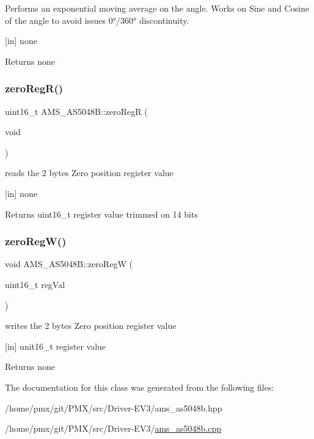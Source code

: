 Performs an exponential moving average on the angle. Works on Sine and Cosine of the angle to avoid issues 0°/360° discontinuity. 

\mbox{[}in\mbox{]} none \begin{DoxyReturn}{Returns}
none 
\end{DoxyReturn}
\mbox{\label{classAMS__AS5048B_a7784bc5f991bb485c2731a7189d277bf}} 
\subsubsection{\texorpdfstring{zero\+Reg\+R()}{zeroRegR()}}
{\footnotesize\ttfamily uint16\+\_\+t A\+M\+S\+\_\+\+A\+S5048\+B\+::zero\+RegR (\begin{DoxyParamCaption}\item[{void}]{ }\end{DoxyParamCaption})}



reads the 2 bytes Zero position register value 

\mbox{[}in\mbox{]} none \begin{DoxyReturn}{Returns}
uint16\+\_\+t register value trimmed on 14 bits 
\end{DoxyReturn}
\mbox{\label{classAMS__AS5048B_a67cbd882f0300705d615ce1e2dff2f47}} 
\subsubsection{\texorpdfstring{zero\+Reg\+W()}{zeroRegW()}}
{\footnotesize\ttfamily void A\+M\+S\+\_\+\+A\+S5048\+B\+::zero\+RegW (\begin{DoxyParamCaption}\item[{uint16\+\_\+t}]{reg\+Val }\end{DoxyParamCaption})}



writes the 2 bytes Zero position register value 

\mbox{[}in\mbox{]} unit16\+\_\+t register value \begin{DoxyReturn}{Returns}
none 
\end{DoxyReturn}


The documentation for this class was generated from the following files\+:\begin{DoxyCompactItemize}
\item 
/home/pmx/git/\+P\+M\+X/src/\+Driver-\/\+E\+V3/ams\+\_\+as5048b.\+hpp\item 
/home/pmx/git/\+P\+M\+X/src/\+Driver-\/\+E\+V3/\hyperlink{ams__as5048b_8cpp}{ams\+\_\+as5048b.\+cpp}\end{DoxyCompactItemize}
